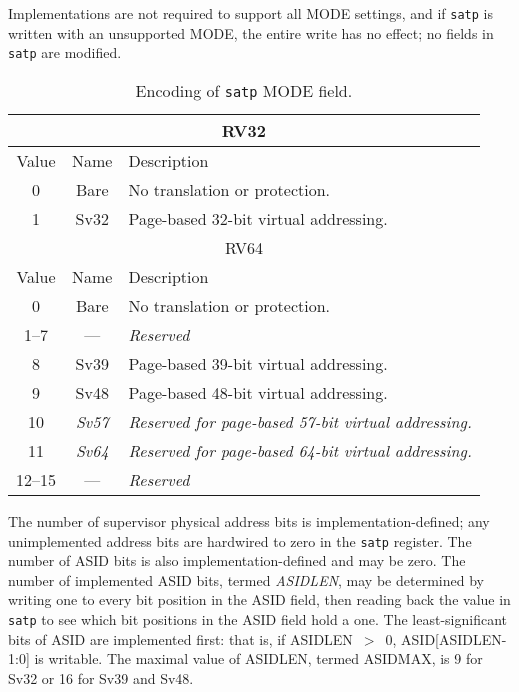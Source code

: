 Implementations are not required to support all MODE settings,
and if {\tt satp} is written with an unsupported MODE, the entire write has
no effect; no fields in {\tt satp} are modified.

\begin{table}[h]
\begin{center}
\begin{tabular}{|c|c|l|}
\hline
\multicolumn{3}{|c|}{RV32} \\
\hline
Value  & Name & Description \\
\hline
0       & Bare  & No translation or protection. \\
1       & Sv32  & Page-based 32-bit virtual addressing. \\
\hline \hline
\multicolumn{3}{|c|}{RV64} \\
\hline
Value  & Name & Description \\
\hline  
0       & Bare  & No translation or protection. \\
1--7    & ---   & {\em Reserved} \\
8       & Sv39  & Page-based 39-bit virtual addressing. \\
9       & Sv48  & Page-based 48-bit virtual addressing. \\
10      & {\em Sv57} & {\em Reserved for page-based 57-bit virtual addressing.} \\
11      & {\em Sv64} & {\em Reserved for page-based 64-bit virtual addressing.} \\
12--15  & ---   & {\em Reserved} \\
\hline
\end{tabular}
\end{center}
\caption{Encoding of {\tt satp} MODE field.}
\label{tab:satp-mode}
\end{table}

The number of supervisor physical address bits is implementation-defined; any
unimplemented address bits are hardwired to zero in the {\tt satp} register.
The number of ASID bits is also implementation-defined and may be zero.  The
number of implemented ASID bits, termed {\mbox {\em ASIDLEN}}, may be
determined by writing one to every bit position in the ASID field, then
reading back the value in {\tt satp} to see which bit positions in the ASID
field hold a one.  The least-significant bits of ASID are implemented first:
that is, if ASIDLEN~$>$~0, ASID[ASIDLEN-1:0] is writable.  The maximal value
of ASIDLEN, termed ASIDMAX, is 9 for Sv32 or 16 for Sv39 and Sv48.


